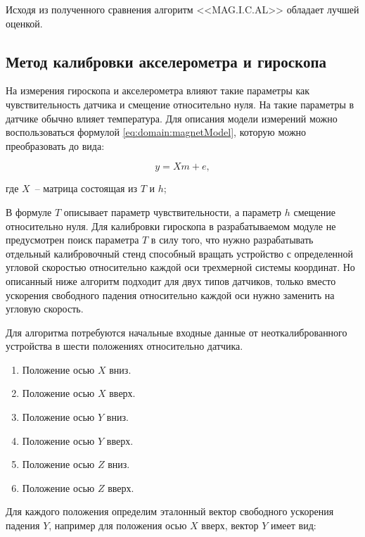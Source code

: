 Исходя из полученного сравнения алгоритм <<MAG.I.C.AL>> обладает лучшей оценкой.

\subsection{Метод калибровки акселерометра и гироскопа}

На измерения гироскопа и акселерометра влияют такие параметры как чувствительность датчика и смещение относительно нуля.
На такие параметры в датчике обычно влияет температура.
Для описания модели измерений можно воспользоваться формулой \ref{eq:domain:magnetModel}, которую можно преобразовать до вида:

\begin{equation}
    \label{eq:domain:accModel}
    y = Xm+e,
  \end{equation}
  \begin{explanationx}
    \item[где] $X$~-- матрица состоящая из $T$ и $h$;
  \end{explanationx}

В формуле $T$ описывает параметр чувствительности, а параметр $h$ смещение относительно нуля.
Для калибровки гироскопа в разрабатываемом модуле не предусмотрен поиск параметра $T$ в силу того, 
что нужно разрабатывать отдельный калибровочный стенд способный вращать устройство с определенной 
угловой скоростью относительно каждой оси трехмерной системы координат. Но описанный ниже алгоритм подходит для двух типов датчиков, 
только вместо ускорения свободного падения относительно каждой оси нужно заменить на угловую скорость.

Для алгоритма потребуются начальные входные данные от неоткалиброванного устройства в шести положениях относительно датчика.
\begin{enumerate}
    \item Положение осью $X$ вниз.
    \item Положение осью $X$ вверх.
    \item Положение осью $Y$ вниз.
    \item Положение осью $Y$ вверх.
    \item Положение осью $Z$ вниз.
    \item Положение осью $Z$ вверх.
\end{enumerate}

Для каждого положения определим эталонный вектор свободного ускорения падения $Y$, например для положения осью $X$ вверх, вектор $Y$ имеет вид:

